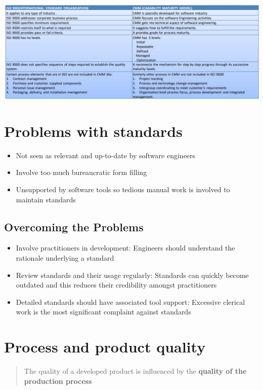 \documentclass{article}
\begin{document}
\begin{center}
  \includegraphics[scale=0.5]{cmm_vs_iso.png}
\end{center}

\section{Problems with standards}
\begin{itemize}
  \item Not seen as relevant and up-to-date by software engineers
  \item Involve too much bureaucratic form filling
  \item Unsupported by software tools so tedious manual work is involved to maintain standards
\end{itemize}

\subsection{Overcoming the Problems}

\begin{itemize}
  \item Involve practitioners in development: Engineers should understand the rationale underlying a standard
  \item Review standards and their usage regularly: Standards can quickly become outdated and this reduces their credibility amongst practitioners
  \item Detailed standards should have associated tool support: Excessive clerical work is the most significant complaint against standards
\end{itemize}

\section{Process and product quality}
\begin{quote}
The quality of a developed product is influenced by the \textbf{quality of the production process}
\end{quote}
\end{document}
